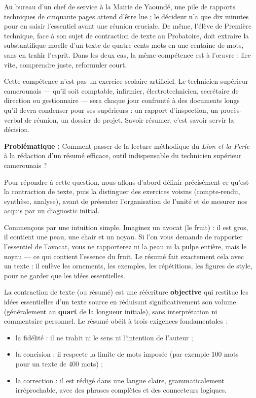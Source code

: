 \documentclass[11pt]{article}
\newcommand{\cle}[1]{{\popxbold\color{popdark}#1}}
\newcounter{popsec}
\newcounter{popsub}
\newcommand{\courssub}[1]{%
  \stepcounter{popsub}%
  \par\vspace{9pt}\noindent{\popxbold\fontsize{11.5}{13}\selectfont\color{popink}{\color{poporange}\thepopsec.\thepopsub}\hspace{6pt}#1}\par\nopagebreak\vspace{4pt}
}
\begin{document}
Au bureau d'un chef de service à la Mairie de Yaoundé, une pile de rapports techniques de cinquante pages attend d'être lue ; le décideur n'a que dix minutes pour en saisir l'essentiel avant une réunion cruciale. De même, l'élève de Première technique, face à son sujet de contraction de texte au Probatoire, doit extraire la substantifique moelle d'un texte de quatre cents mots en une centaine de mots, sans en trahir l'esprit. Dans les deux cas, la même compétence est à l'œuvre : lire vite, comprendre juste, reformuler court.

Cette compétence n'est pas un exercice scolaire artificiel. Le technicien supérieur camerounais — qu'il soit comptable, infirmier, électrotechnicien, secrétaire de direction ou gestionnaire — sera chaque jour confronté à des documents longs qu'il devra condenser pour ses supérieurs : un rapport d'inspection, un procès-verbal de réunion, un dossier de projet. Savoir résumer, c'est savoir servir la décision.

\textbf{Problématique :} Comment passer de la lecture méthodique du \emph{Lion et la Perle} à la rédaction d'un résumé efficace, outil indispensable du technicien supérieur camerounais ?

Pour répondre à cette question, nous allons d'abord définir précisément ce qu'est la contraction de texte, puis la distinguer des exercices voisins (compte-rendu, synthèse, analyse), avant de présenter l'organisation de l'unité et de mesurer nos acquis par un diagnostic initial.

\courssub{Qu'est-ce que la contraction de texte ?}

Commençons par une intuition simple. Imaginez un avocat (le fruit) : il est gros, il contient une peau, une chair et un noyau. Si l'on vous demande de rapporter l'essentiel de l'avocat, vous ne rapporterez ni la peau ni la pulpe entière, mais le noyau — ce qui contient l'essence du fruit. Le résumé fait exactement cela avec un texte : il enlève les ornements, les exemples, les répétitions, les figures de style, pour ne garder que les \cle{idées essentielles}.

\begin{definition}
La \cle{contraction de texte} (ou \cle{résumé}) est une réécriture \textbf{objective} qui restitue les idées essentielles d'un texte source en réduisant significativement son volume (généralement au \textbf{quart} de la longueur initiale), sans interprétation ni commentaire personnel. Le résumé obéit à trois exigences fondamentales :
\begin{itemize}
\item la \cle{fidélité} : il ne trahit ni le sens ni l'intention de l'auteur ;
\item la \cle{concision} : il respecte la limite de mots imposée (par exemple 100 mots pour un texte de 400 mots) ;
\item la \cle{correction} : il est rédigé dans une langue claire, grammaticalement irréprochable, avec des phrases complètes et des connecteurs logiques.
\end{itemize}
\end{definition}
\end{document}
